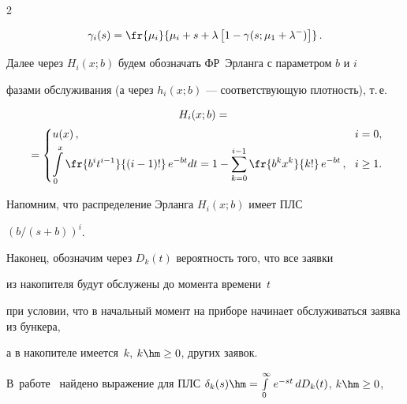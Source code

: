 \begin{multicols}{2}


\begin{equation*}


\gamma_i(s) = \fr{\mu_i }{\mu_i + s + \lambda\left[1 - \gamma(s;\mu_1+\lambda^-)\right]}\,.


\end{equation*}





Далее через $H_i(x;b)$ будем обозначать ФР~Эрланга с параметром $b$ и $i$


фазами обслуживания (а через $h_i(x;b)$ --- соответствующую плотность), т.\,е.




\begin{multline*}


H_i(x;b) = {}\\


{}=


\begin{cases}


u(x)\,,              &\! i=0, \\[3pt]


\displaystyle \int\limits_0^{x}


\fr{b^i t^{i-1}}{(i-1)!} \,e^{-b t} dt


= 1- \sum\limits_{k=0}^{i-1} \fr{b^k x^k }{k!}\, e^{-b t}\,, &\! i \ge 1.


\end{cases}\hspace*{-1.9182pt}


\end{multline*}




Напомним, что распределение Эрланга $H_i(x;b)$ имеет ПЛС


$(b/(s+b))^i$.





Наконец, обозначим через $D_k(t)$ вероятность того, что все заявки


из накопителя будут обслужены до момента времени~$t$


при условии, что в начальный момент на приборе начинает обслуживаться заявка из бункера,


а в накопителе имеется~$k$, $k \hm\ge 0$, других заявок.


В~работе~\cite{6} найдено выражение для ПЛС $\delta_k(s)\hm=\int\limits_{0}^{\infty} \,e^{-st}\,dD_k(t)$, $k\hm \ge 0$,



\end{multicols}
